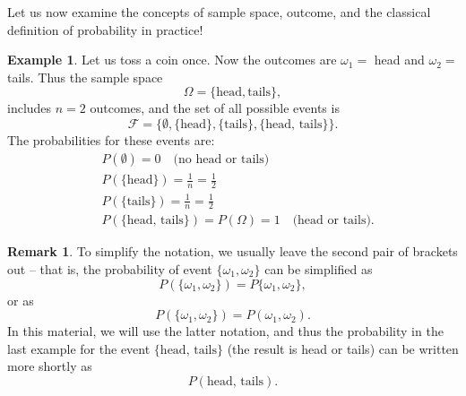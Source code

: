 \documentclass[12pt,a4paper,leqno]{report}
\newcommand{\F}{\mathcal{F}}
\theoremstyle{plain}
\theoremstyle{definition}
\newtheorem{esim}[equation]{Example}
\newtheorem{remark}[equation]{Remark}
\begin{document}
Let us now examine the concepts of sample space, outcome, and the classical definition of probability in practice!

\begin{esim} Let us toss a coin once. Now the outcomes are $\omega_1 = $ head and $\omega_2 = $  tails. Thus the sample space 
\[
\Omega = \{\mathrm{head, tails} \},
\]
includes $n=2$ outcomes, and the set of all possible events is
\[
\F = \{\emptyset,  \{\mathrm{head} \}, \{\mathrm{tails}\} , \{\mathrm{head} ,\, \mathrm{tails} \}  \}. 
\]
The probabilities for these events are: 
\[
\begin{split}
&P(\emptyset) = 0 \quad \text{(no head or tails)} \\
&P(\{\mathrm{head}\}) = \frac{1}{n} = \frac{1}{2} \\
&P(\{\mathrm{tails}\}) = \frac{1}{n} = \frac{1}{2} \\
&P(\{\mathrm{head, \, tails}\}) = P(\Omega) = 1 \quad \text{(head or tails)}. 
\end{split}
\]
\end{esim}

\begin{remark}
\label{huom:brackets}
To simplify the notation, we usually leave the second pair of brackets out -- that is, the probability of event $\{ \omega_1, \omega_2\}$ can be simplified as
\[
P(\{ \omega_1, \omega_2\}) = P\{ \omega_1, \omega_2\}, 
\]
or as
\[
P(\{ \omega_1, \omega_2\}) = P(\omega_1, \omega_2). 
\]
In this material, we will use the latter notation, and thus the probability in the last example for the event $\{\mathrm{head, \, tails}\}$ (the result is head or tails) can be written more shortly as 
\[
P(\mathrm{head, \, tails}).
\]
\end{remark}
\end{document}
